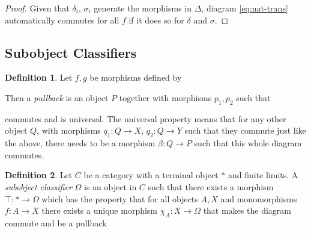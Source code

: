 \documentclass[12pt]{article}
\theoremstyle{definition}
\newtheorem{definition}{Definition}[section]
\newcommand{\1}{\mathbbm{1}}
\begin{document}
\begin{proof}
    Given that $\delta_i$, $\sigma_i$ generate the morphisms in $\Delta$, diagram \ref{eq:nat-trans} automatically commutes for all $f$ if it does so for $\delta$ and $\sigma$.
\end{proof}
\subsection{Subobject Classifiers}
\begin{definition}
    Let $f, g$ be morphisms defined by
    \begin{center}
    \end{center}

    Then a \emph{pullback} is an object $P$ together with morphisms $p_1, p_2$ such that 
    \begin{center}
    \end{center}
    commutes and is universal. The universal property means that for any other object $Q$, with morphisms $q_1: Q\to X$, $q_2: Q\to Y$ such that they commute just like the above, there needs to be a morphism $\beta: Q\to P$ such that this whole diagram commutes. 

    \begin{center}
    \end{center}
\end{definition}

\begin{definition}
    Let $C$ be a category with a terminal object $*$ and finite limits. A \emph{subobject classifier} $\Omega$ is an object in $C$ such that there exists a morphism $\top: * \to \Omega$ which has the property that for all objects $A, X$ and monomorphisms $f: A\to X$ there exists a unique morphism $\chi_A: X\to \Omega$ that makes the diagram commute and be a pullback
    \begin{center}
    \end{center}
\end{definition}
\end{document}
